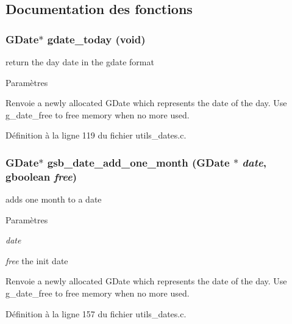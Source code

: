 \subsection{Documentation des fonctions}
\subsubsection[{gdate\_\-today}]{\setlength{\rightskip}{0pt plus 5cm}GDate$\ast$ gdate\_\-today (void)}\label{utils__dates_8h_a6b816aab8b5dd412b89406bcc587738b}
return the day date in the gdate format


\begin{DoxyParams}{Paramètres}
\item[{\em }]\end{DoxyParams}
\begin{DoxyReturn}{Renvoie}
a newly allocated GDate which represents the date of the day. Use g\_\-date\_\-free to free memory when no more used. 
\end{DoxyReturn}


Définition à la ligne 119 du fichier utils\_\-dates.c.

\subsubsection[{gsb\_\-date\_\-add\_\-one\_\-month}]{\setlength{\rightskip}{0pt plus 5cm}GDate$\ast$ gsb\_\-date\_\-add\_\-one\_\-month (GDate $\ast$ {\em date}, \/  gboolean {\em free})}\label{utils__dates_8h_a146f578d7f01aba9a13fbed426295b9d}
adds one month to a date


\begin{DoxyParams}{Paramètres}
\item[{\em date}]\item[{\em free}]the init date\end{DoxyParams}
\begin{DoxyReturn}{Renvoie}
a newly allocated GDate which represents the date of the day. Use g\_\-date\_\-free to free memory when no more used. 
\end{DoxyReturn}


Définition à la ligne 157 du fichier utils\_\-dates.c.

